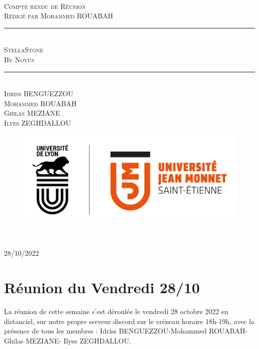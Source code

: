 \documentclass[a4paper, 12pt]{article}
\newcommand{\HRule}{\rule{\linewidth}{0.5mm}}
\begin{document}
\begin{titlepage}
  \begin{sffamily}
  \begin{center}

   
    \textsc{\LARGE }\\[2cm]

    \textsc{\Large Compte rendu de Réunion}\\[1.5cm]
    \textsc{\Medium Rédigé par Mohammed ROUABAH }

    \HRule \\[0.4cm]
    { \huge  \textsc{StellaStone} \\
    \textsc{\Large By Novus}\\ [0.4cm] }
	

    \HRule \\[2cm]
    \textsc {Idriss BENGUEZZOU\\Mohammed ROUABAH\\Ghilas MEZIANE \\ Ilyes ZEGHDALLOU}
 \begin{figure}
     \centering
    \includegraphics[scale=0.2]{logoUJM.png}
     \label{fig:ujm_logo}
 \end{figure}
   
    \

    \vfill

    {\large {} 28/10/2022}

  \end{center}
  \end{sffamily}
\end{titlepage}

\newpage

\section{Réunion du Vendredi 28/10}
La réunion de cette semaine s'est déroulée le vendredi 28 octobre 2022 en distanciel, sur notre propre serveur discord sur le créneau horaire 18h-19h, avec la présence de tous les membres : Idriss BENGUEZZOU-Mohammed ROUABAH-Ghilas MEZIANE- Ilyes ZEGHDALLOU. \\
\end{document}
